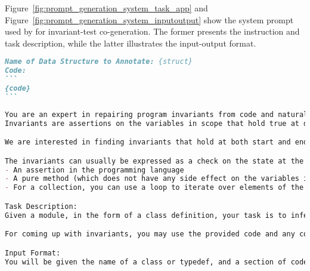 Figure~\ref{fig:prompt_generation_system_task_app} and Figure~\ref{fig:prompt_generation_system_inputoutput} show the system prompt used by \tech for invariant-test co-generation. The former presents the instruction and task description, while the latter illustrates the input-output format.

\begin{figure*}[htp]
\begin{lstlisting}[language=markdown]
Name of Data Structure to Annotate: {struct}
Code:
```
{code}
```
\end{lstlisting}
\vspace{-0.1in}
    \caption{\tech Generation user prompt template.}
    \label{appendix:prompt_generation_user}
\end{figure*}

\begin{figure*}[htp]
\begin{lstlisting}[language=markdown]
You are an expert in repairing program invariants from code and natural language.
Invariants are assertions on the variables in scope that hold true at different program points. 

We are interested in finding invariants that hold at both start and end of a function within a data structure. Such an invariant is commonly known as an object invariant.  

The invariants can usually be expressed as a check on the state at the particular program point. The check should be expressed as a check in the same underlying programming language which evaluates to true or false. To express these, you can use:
- An assertion in the programming language
- A pure method (which does not have any side effect on the variables in scope) that checks one or more assertion
- For a collection, you can use a loop to iterate over elements of the collection and assert something on each element or a pair of elements.  

Task Description: 
Given a module, in the form of a class definition, your task is to infer object invariants about the class. For doing so, you may examine how the methods of the class read and modify the various fields of the class. 

For coming up with invariants, you may use the provided code and any comments in the code. You may also use world knowledge to guide the search for invariants. 

Input Format:
You will be given the name of a class or typedef, and a section of code containing the definition of the class. You will also be given the definitions of functions which read and modify the fields of the class. 


\end{lstlisting}
\end{figure*}
